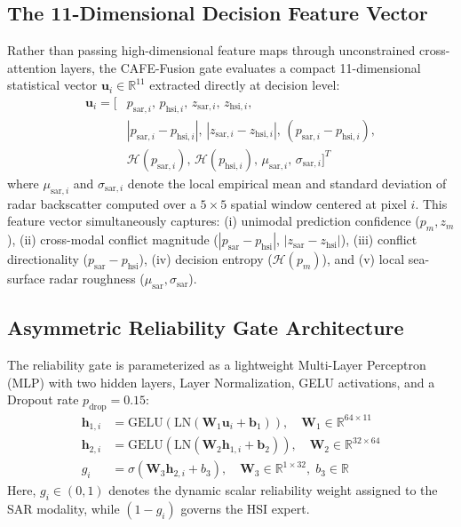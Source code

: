 \documentclass[conference]{IEEEtran}
\begin{document}
\subsection{The 11-Dimensional Decision Feature Vector}
Rather than passing high-dimensional feature maps through unconstrained cross-attention layers, the CAFE-Fusion gate evaluates a compact 11-dimensional statistical vector $\mathbf{u}_i \in \mathbb{R}^{11}$ extracted directly at decision level:
\begin{align}
\label{eq:feature_vector}
\mathbf{u}_i = \big[ & p_{\text{sar}, i}, \, p_{\text{hsi}, i}, \, z_{\text{sar}, i}, \, z_{\text{hsi}, i}, \nonumber \\
& |p_{\text{sar}, i} - p_{\text{hsi}, i}|, \, |z_{\text{sar}, i} - z_{\text{hsi}, i}|, \, (p_{\text{sar}, i} - p_{\text{hsi}, i}), \nonumber \\
& \mathcal{H}(p_{\text{sar}, i}), \, \mathcal{H}(p_{\text{hsi}, i}), \, \mu_{\text{sar}, i}, \, \sigma_{\text{sar}, i} \big]^T
\end{align}
where $\mu_{\text{sar}, i}$ and $\sigma_{\text{sar}, i}$ denote the local empirical mean and standard deviation of radar backscatter computed over a $5 \times 5$ spatial window centered at pixel $i$. This feature vector simultaneously captures: (i) unimodal prediction confidence ($p_m, z_m$), (ii) cross-modal conflict magnitude ($|p_{\text{sar}} - p_{\text{hsi}}|$, $|z_{\text{sar}} - z_{\text{hsi}}|$), (iii) conflict directionality ($p_{\text{sar}} - p_{\text{hsi}}$), (iv) decision entropy ($\mathcal{H}(p_m)$), and (v) local sea-surface radar roughness ($\mu_{\text{sar}}, \sigma_{\text{sar}}$).

\subsection{Asymmetric Reliability Gate Architecture}
The reliability gate is parameterized as a lightweight Multi-Layer Perceptron (MLP) with two hidden layers, Layer Normalization, GELU activations, and a Dropout rate $p_{\text{drop}} = 0.15$:
\begin{align}
\mathbf{h}_{1, i} &= \text{GELU}(\text{LN}(\mathbf{W}_1 \mathbf{u}_i + \mathbf{b}_1)), \quad \mathbf{W}_1 \in \mathbb{R}^{64 \times 11} \\
\mathbf{h}_{2, i} &= \text{GELU}(\text{LN}(\mathbf{W}_2 \mathbf{h}_{1, i} + \mathbf{b}_2)), \quad \mathbf{W}_2 \in \mathbb{R}^{32 \times 64} \\
g_i &= \sigma(\mathbf{W}_3 \mathbf{h}_{2, i} + b_3), \quad \mathbf{W}_3 \in \mathbb{R}^{1 \times 32}, \; b_3 \in \mathbb{R}
\end{align}
Here, $g_i \in (0, 1)$ denotes the dynamic scalar reliability weight assigned to the SAR modality, while $(1 - g_i)$ governs the HSI expert.
\end{document}
